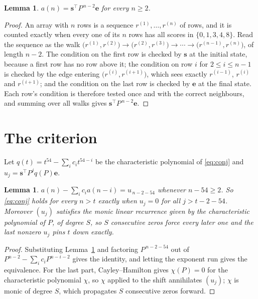 \documentclass[11pt,a4paper]{article}
\theoremstyle{plain}
\newtheorem{lemma}[theorem]{Lemma}
\theoremstyle{definition}
\begin{document}
\begin{lemma}\label{lem:walk}
$a(n)=\mathbf{s}^{\!\top}P^{\,n-2}\mathbf{e}$ for every $n\ge2$.
\end{lemma}

\begin{proof}
An array with $n$ rows is a sequence $r^{(1)},\dots,r^{(n)}$ of rows, and it is counted
exactly when every one of its $n$ rows has all scores in $\{0,1,3,4,8\}$. Read the sequence as the
walk $\bigl(r^{(1)},r^{(2)}\bigr)\to\bigl(r^{(2)},r^{(3)}\bigr)\to\cdots\to
\bigl(r^{(n-1)},r^{(n)}\bigr)$, of length $n-2$. The condition on the first row is
checked by $\mathbf{s}$ at the initial state, because a first row has no row above it; the
condition on row $i$ for $2\le i\le n-1$ is checked by the edge entering
$\bigl(r^{(i)},r^{(i+1)}\bigr)$, which sees exactly $r^{(i-1)}$, $r^{(i)}$ and
$r^{(i+1)}$; and the condition on the last row is checked by $\mathbf{e}$ at the final
state. Each row's condition is therefore tested once and with the correct neighbours, and
summing over all walks gives $\mathbf{s}^{\!\top}P^{\,n-2}\mathbf{e}$.
\end{proof}

\section{The criterion}

Let $q(t)=t^{54}-\sum_i c_i t^{54-i}$ be the characteristic polynomial of
\eqref{eq:conj} and $u_j=\mathbf{s}^{\!\top}P^{j}q(P)\mathbf{e}$.

\begin{lemma}\label{lem:crit}
$a(n)-\sum_i c_i a(n-i)=u_{\,n-2-54}$ whenever $n-54\ge2$. So \eqref{eq:conj}
holds for every $n>t$ exactly when $u_j=0$ for all $j>t-2-54$. Moreover $(u_j)$
satisfies the monic linear recurrence given by the characteristic polynomial of $P$, of
degree $S$, so $S$ consecutive zeros force every later one and the last nonzero $u_j$ pins
$t$ down exactly.
\end{lemma}

\begin{proof}
Substituting Lemma~\ref{lem:walk} and factoring $P^{\,n-2-54}$ out of
$P^{n-2}-\sum_i c_i P^{n-i-2}$ gives the identity, and letting the exponent run gives the
equivalence. For the last part, Cayley--Hamilton gives $\chi(P)=0$ for the characteristic
polynomial $\chi$, so $\chi$ applied to the shift annihilates $(u_j)$; $\chi$ is monic of
degree $S$, which propagates $S$ consecutive zeros forward.
\end{proof}
\end{document}
